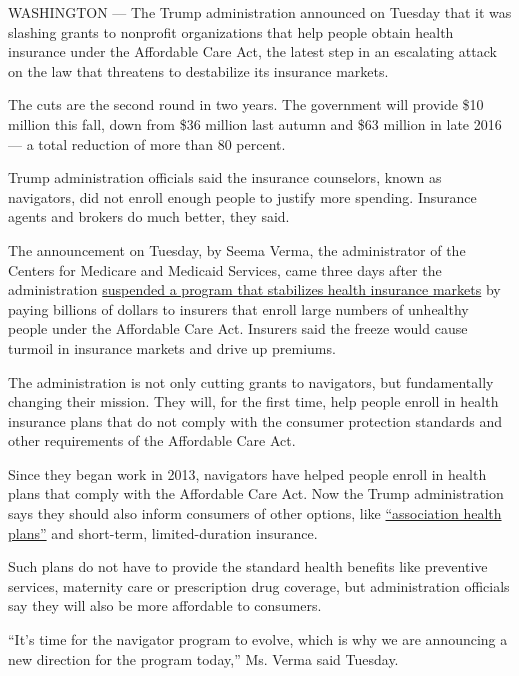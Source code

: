 WASHINGTON --- The Trump administration announced on Tuesday that it was
slashing grants to nonprofit organizations that help people obtain
health insurance under the Affordable Care Act, the latest step in an
escalating attack on the law that threatens to destabilize its insurance
markets.

The cuts are the second round in two years. The government will provide
\$10 million this fall, down from \$36 million last autumn and \$63
million in late 2016 --- a total reduction of more than 80 percent.

Trump administration officials said the insurance counselors, known as
navigators, did not enroll enough people to justify more spending.
Insurance agents and brokers do much better, they said.

The announcement on Tuesday, by Seema Verma, the administrator of the
Centers for Medicare and Medicaid Services, came three days after the
administration
\href{https://www.nytimes3xbfgragh.onion/2018/07/07/us/politics/trump-risk-adjustment-payments-obamacare.html}{suspended
a program that stabilizes health insurance markets} by paying billions
of dollars to insurers that enroll large numbers of unhealthy people
under the Affordable Care Act. Insurers said the freeze would cause
turmoil in insurance markets and drive up premiums.

The administration is not only cutting grants to navigators, but
fundamentally changing their mission. They will, for the first time,
help people enroll in health insurance plans that do not comply with the
consumer protection standards and other requirements of the Affordable
Care Act.

Since they began work in 2013, navigators have helped people enroll in
health plans that comply with the Affordable Care Act. Now the Trump
administration says they should also inform consumers of other options,
like
\href{https://www.nytimes3xbfgragh.onion/2018/06/19/us/politics/trump-affordable-care-act-health-insurance.html}{``association
health plans''} and short-term, limited-duration insurance.

Such plans do not have to provide the standard health benefits like
preventive services, maternity care or prescription drug coverage, but
administration officials say they will also be more affordable to
consumers.

``It's time for the navigator program to evolve, which is why we are
announcing a new direction for the program today,'' Ms. Verma said
Tuesday.

